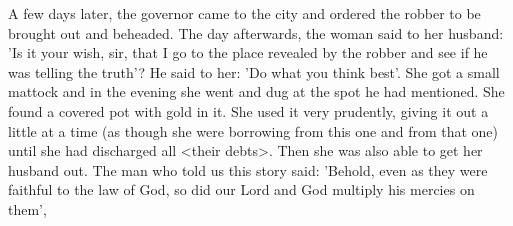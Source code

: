 A few days later, the governor came to the city and ordered the
robber to be brought out and beheaded. The day afterwards, the
woman said to her husband: 'Is it your wish, sir, that I go to the
place revealed by the robber and see if he was telling the truth'? He
said to her: 'Do what you think best'. She got a small mattock and
in the evening she went and dug at the spot he had mentioned. She
found a covered pot with gold in it. She used it very prudently,
giving it out a little at a time (as though she were borrowing from
this one and from that one) until she had discharged all <their
debts>. Then she was also able to get her husband out. The man
who told us this story said: 'Behold, even as they were faithful to
the law of God, so did our Lord and God multiply his mercies on
them',

